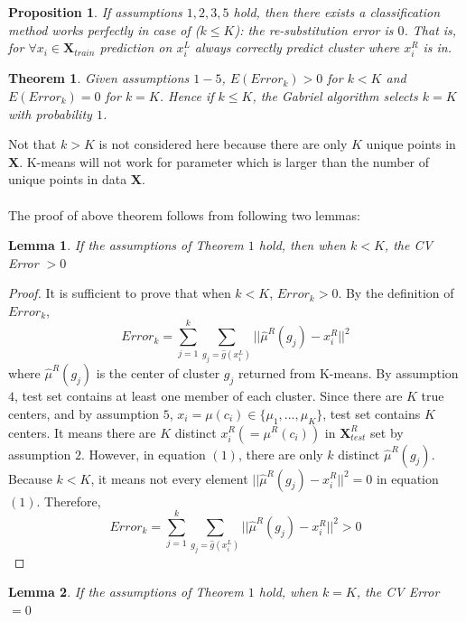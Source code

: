 \documentclass[11pt]{article}
\newtheorem{theorem}{Theorem}
\newtheorem{lemma}{Lemma}
\newtheorem{proposition}{Proposition}
\begin{document}
\begin{proposition}
	If assumptions $1, 2, 3, 5$ hold, then there exists a classification method works perfectly in case of ($k \leq K$): the re-substitution error is $0$. That is, for $\forall x_i \in \mathbf{X}_{train}$ prediction on $x^L_i$ always correctly predict cluster where $x^R_i$ is in.
\end{proposition}

\begin{theorem}
Given assumptions $1-5$, $ E\left(Error_k\right) > 0$ for $k<K$ and  $ E\left(Error_k\right) = 0$ for $k=K$. Hence if $k \leq K$, the Gabriel algorithm selects $k=K$ with probability $1$.
\end{theorem}
\noindent
Not that $k > K$ is not considered here because there are only $K$ unique points in $\mathbf{X}$. K-means will not work for parameter which is larger than the number of unique points in data $\mathbf{X}$.\\\\ 
\noindent
The proof of above theorem follows from following two lemmas:
\begin{lemma}
	If the assumptions of Theorem $1$ hold, then when $k<K$, the CV Error $>0$
\end{lemma}
\begin{proof}
	It is sufficient to prove that when $k<K$,  $Error_k>0$. By the definition of $Error_k$,
\begin{equation}
Error_k = \sum^k_{j=1} \sum_{g_j = \hat{g} \left(x^L_i\right)} ||\hat{\mu}^R \left(g_j\right) - x^R_i||^2
\end{equation}
	where $\hat{\mu}^R \left(g_j\right)$ is the center of cluster $g_j$ returned from K-means. By assumption $4$, test set contains at least one member of each cluster. Since there are $K$ true centers, and by assumption $5$, $x_i = \mu \left(c_i\right) \in \{\mu_1,...,\mu_K\} $, test set contains $K$ centers. It means there are $K$ distinct $x^R_i \left(=\mu^R \left(c_i\right)\right)$ in $\mathbf{X}^R_{test}$ set by assumption $2$. However, in equation $(1)$, there are only $k$ distinct $\hat{\mu}^R \left(g_j\right)$.  Because $k < K$, it means not every element $||\hat{\mu}^R \left(g_j\right) - x^R_i||^2 = 0$ in equation $(1)$. Therefore,  $$Error_k = \sum^k_{j=1} \sum_{g_j = \hat{g} \left(x^L_i\right)} ||\hat{\mu}^R \left(g_j\right) - x^R_i||^2 > 0$$
\end{proof}
\begin{lemma}
	If the assumptions of Theorem $1$ hold, when $k=K$, the CV Error $=0$
\end{lemma}
\end{document}
